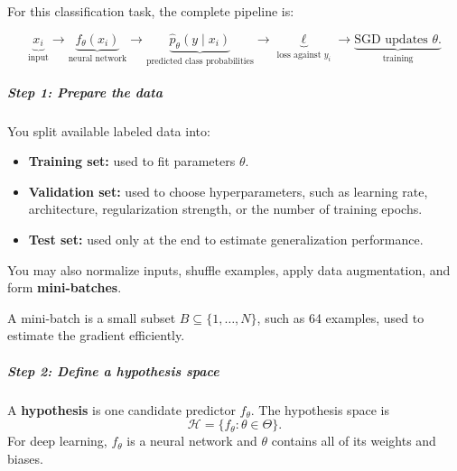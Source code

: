 \documentclass[11pt,a4paper]{article}
\theoremstyle{definition}
\begin{document}
For this classification task, the complete pipeline is:

\begin{equation*}
\underbrace{x_i}_{\text{input}} \longrightarrow \underbrace{f_\theta(x_i)}_{\text{neural network}} \longrightarrow \underbrace{\hat{p}_\theta(y \mid x_i)}_{\text{predicted class probabilities}} \longrightarrow \underbrace{\ell}_{\text{loss against } y_i} \longrightarrow \underbrace{\text{SGD updates } \theta.}_{\text{training}}
\end{equation*}

\subparagraph{Step 1: Prepare the data}

You split available labeled data into:

\begin{itemize}
    \item \textbf{Training set:} used to fit parameters $\theta$.
    \item \textbf{Validation set:} used to choose hyperparameters, such as learning rate, architecture, regularization strength, or the number of training epochs.
    \item \textbf{Test set:} used only at the end to estimate generalization performance.
\end{itemize}

You may also normalize inputs, shuffle examples, apply data augmentation, and form \textbf{mini-batches}.

A mini-batch is a small subset $B \subseteq \{1, \dots, N\}$, such as 64 examples, used to estimate the gradient efficiently.

\subparagraph{Step 2: Define a hypothesis space}

A \textbf{hypothesis} is one candidate predictor $f_{\theta}$. The hypothesis space is
\[
\mathcal{H} = \{f_{\theta} : \theta \in \Theta\}.
\]
For deep learning, $f_{\theta}$ is a neural network and $\theta$ contains all of its weights and biases.
\end{document}
